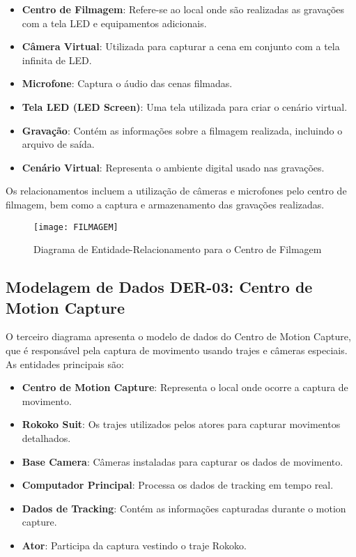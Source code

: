 \begin{itemize}
    \item \textbf{Centro de Filmagem}: Refere-se ao local onde são realizadas as gravações com a tela LED e equipamentos adicionais.
    \item \textbf{Câmera Virtual}: Utilizada para capturar a cena em conjunto com a tela infinita de LED.
    \item \textbf{Microfone}: Captura o áudio das cenas filmadas.
    \item \textbf{Tela LED (LED Screen)}: Uma tela utilizada para criar o cenário virtual.
    \item \textbf{Gravação}: Contém as informações sobre a filmagem realizada, incluindo o arquivo de saída.
    \item \textbf{Cenário Virtual}: Representa o ambiente digital usado nas gravações.
\end{itemize}

Os relacionamentos incluem a utilização de câmeras e microfones pelo centro de filmagem, bem como a captura e armazenamento das gravações realizadas.

\begin{figure}[ht]
    \centering
    \texttt{[image: FILMAGEM]}
    \caption{Diagrama de Entidade-Relacionamento para o Centro de Filmagem}
    \label{fig:filmagem}
\end{figure}

\subsection{Modelagem de Dados DER-03: Centro de Motion Capture}
O terceiro diagrama apresenta o modelo de dados do Centro de Motion Capture, que é responsável pela captura de movimento usando trajes e câmeras especiais. As entidades principais são:

\begin{itemize}
    \item \textbf{Centro de Motion Capture}: Representa o local onde ocorre a captura de movimento.
    \item \textbf{Rokoko Suit}: Os trajes utilizados pelos atores para capturar movimentos detalhados.
    \item \textbf{Base Camera}: Câmeras instaladas para capturar os dados de movimento.
    \item \textbf{Computador Principal}: Processa os dados de tracking em tempo real.
    \item \textbf{Dados de Tracking}: Contém as informações capturadas durante o motion capture.
    \item \textbf{Ator}: Participa da captura vestindo o traje Rokoko.
\end{itemize}

